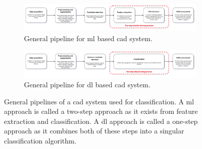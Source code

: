 \begin{figure}
    \centering
    \begin{subfigure}{\textwidth}
        \centering
        \includegraphics[width=\textwidth]{../images/introduction/cad_pipeline_ml.pdf}
        \captionsetup{width=0.9\linewidth}
        \captionsetup{justification=centering}
        \caption{General pipeline for \gls{ml} based \gls{cad} system.}
        \label{fig:cad_pipeline_ml}
    \end{subfigure}
    \hfill
    \begin{subfigure}{\textwidth}
        \centering
        \includegraphics[width=\textwidth]{../images/introduction/cad_pipeline_dl.pdf}
        \captionsetup{width=0.9\linewidth}
        \captionsetup{justification=centering}
        \caption{General pipeline for \gls{dl} based \gls{cad} system.}
        \label{fig:cad_pipeline_dl}
    \end{subfigure}
    \captionsetup{width=0.9\linewidth}
    \captionsetup{justification=centering}
    \caption{General pipelines of a \gls{cad} system used for classification. A \gls{ml} approach is called a two-step approach as it exists from feature extraction and classification. A \gls{dl} approach is called a one-step approach as it combines both of these steps into a singular classification algorithm.}
    \label{fig:cad_pipeline}
\end{figure}

